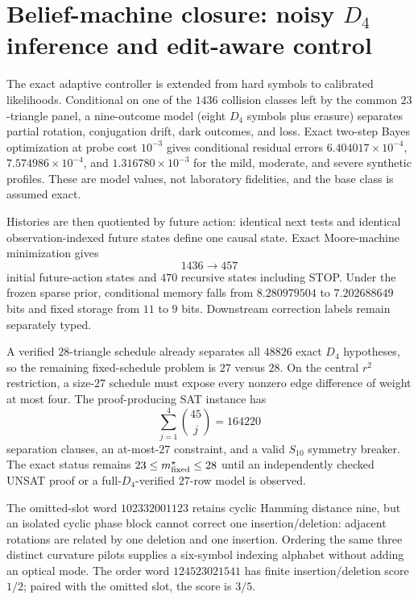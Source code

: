 \section*{Belief-machine closure: noisy $D_4$ inference and edit-aware control}

The exact adaptive controller is extended from hard symbols to calibrated likelihoods.
Conditional on one of the $1436$ collision classes left by the common $23$-triangle panel,
a nine-outcome model (eight $D_4$ symbols plus erasure) separates partial rotation,
conjugation drift, dark outcomes, and loss.  Exact two-step Bayes optimization at probe cost
$10^{-3}$ gives conditional residual errors $6.404017\times10^{-4}$,
$7.574986\times10^{-4}$, and $1.316780\times10^{-3}$ for the mild, moderate, and severe
synthetic profiles.  These are model values, not laboratory fidelities, and the base class
is assumed exact.

Histories are then quotiented by future action: identical next tests and identical
observation-indexed future states define one causal state.  Exact Moore-machine
minimization gives
\[
1436\longrightarrow457
\]
initial future-action states and $470$ recursive states including STOP.  Under the frozen
sparse prior, conditional memory falls from $8.280979504$ to $7.202688649$ bits and fixed
storage from $11$ to $9$ bits.  Downstream correction labels remain separately typed.

A verified $28$-triangle schedule already separates all $48826$ exact $D_4$ hypotheses,
so the remaining fixed-schedule problem is $27$ versus $28$.  On the central $r^2$
restriction, a size-$27$ schedule must expose every nonzero edge difference of weight at
most four.  The proof-producing SAT instance has
\[
\sum_{j=1}^{4}{45\choose j}=164220
\]
separation clauses, an at-most-$27$ constraint, and a valid $S_{10}$ symmetry breaker.
The exact status remains $23\le m^\star_{\rm fixed}\le28$ until an independently checked
UNSAT proof or a full-$D_4$-verified $27$-row model is observed.

The omitted-slot word $102332001123$ retains cyclic Hamming distance nine, but an isolated
cyclic phase block cannot correct one insertion/deletion: adjacent rotations are related by
one deletion and one insertion.  Ordering the same three distinct curvature pilots supplies
a six-symbol indexing alphabet without adding an optical mode.  The order word
$124523021541$ has finite insertion/deletion score $1/2$; paired with the omitted slot, the
score is $3/5$.

